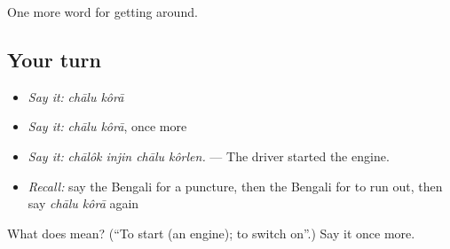 \begin{grammarlens}[title={What you've built}]
One more word for getting around.
\end{grammarlens}

\subsection*{Your turn}
\begin{itemize}
\raggedright
  \item \emph{Say it:} \emph{chālu kôrā}
  \item \emph{Say it:} \emph{chālu kôrā}, once more
  \item \emph{Say it:} \emph{chālôk injin chālu kôrlen.} — The driver started the engine.
  \item \emph{Recall:} say the Bengali for a puncture, then the Bengali for to run out, then say \emph{chālu kôrā} again
\end{itemize}

\begin{tcolorbox}[breakable,colback=teal!4,colframe=teal!35!black,title={Before you move on}]
What does   mean? (\textquotedblleft{}To start (an engine); to switch on\textquotedblright{}.) Say it once more.
\end{tcolorbox}
